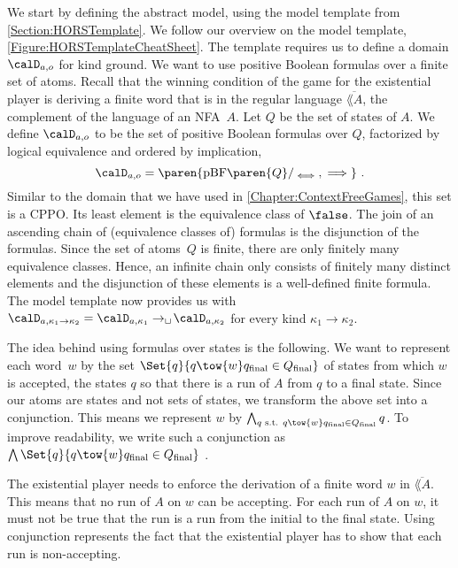 \documentclass[../../diss.tex]{subfiles}
\begin{document}
We start by defining the abstract model, using the model template from \cref{Section:HORSTemplate}.
We follow our overview on the model template, \cref{Figure:HORSTemplateCheatSheet}.
The template requires us to define a domain $\domaina{\ground}$ for kind ground.
We want to use positive Boolean formulas over a finite set of atoms.
Recall that the winning condition of the game for the existential player is deriving a finite word that is in the regular language $\overline{\lang{A}}$, the complement of the language of an NFA~$A$.
Let $Q$ be the set of states of $A$.
We define $\domaina{\ground}$ to be the set of positive Boolean formulas over $Q$, factorized by logical equivalence and ordered by implication,
\[
    \domaina{\ground} =
    \paren{ \pBF\paren{Q}/_{\lequiv},\lleq }
    \ .
\]
Similar to the domain that we have used in \cref{Chapter:ContextFreeGames}, this set is a CPPO.\@
Its least element is the equivalence class of $\false$.
The join of an ascending chain of (equivalence classes of) formulas is the disjunction of the formulas.
Since the set of atoms~$Q$ is finite, there are only finitely many equivalence classes.
Hence, an infinite chain only consists of finitely many distinct elements and the disjunction of these elements is a well-defined finite formula.
The model template now provides us with $\domaina{\kappa_1 \to \kappa_2} = \domaina{\kappa_1} \cto \domaina{\kappa_2}$ for every kind $\kappa_1 \to \kappa_2$.

The idea behind using formulas over states is the following.
We want to represent each word~$w$ by the set $\Set{ q }{ q \tow{w} \qfinal \in \QF}$ of states from which $w$ is accepted, \ie the states $q$ so that there is a run of $A$ from $q$ to a final state.
Since our atoms are states and not sets of states, we transform the above set into a conjunction.
This means we represent $w$ by $\bigwedge_{q \text{ s.t. } q \tow{w} \qfinal \in \QF} q$.
To improve readability, we write such a conjunction as $\bigwedge \Set{ q }{ q \tow{w} \qfinal \in \QF}$ .

The existential player needs to enforce the derivation of a finite word $w$ in $\overline{\lang{A}}$.
This means that no run of $A$ on $w$ can be accepting.
For each run of $A$ on $w$, it must not be true that the run is a run from the initial to the final state.
Using conjunction represents the fact that the existential player has to show that each run is non-accepting.
\end{document}

